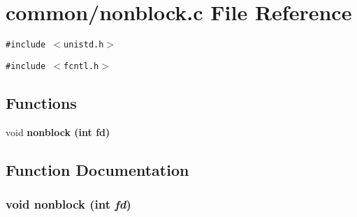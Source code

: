 \section{common/nonblock.c File Reference}
\label{nonblock_8c}
{\tt \#include $<$unistd.h$>$}\par
{\tt \#include $<$fcntl.h$>$}\par
\subsection*{Functions}
\begin{CompactItemize}
\item 
void \bf{nonblock} (int fd)
\end{CompactItemize}


\subsection{Function Documentation}
\subsubsection{\setlength{\rightskip}{0pt plus 5cm}void nonblock (int {\em fd})}\label{nonblock_8c_0bc329b3d35a534cea0f4ec01362e65b}


